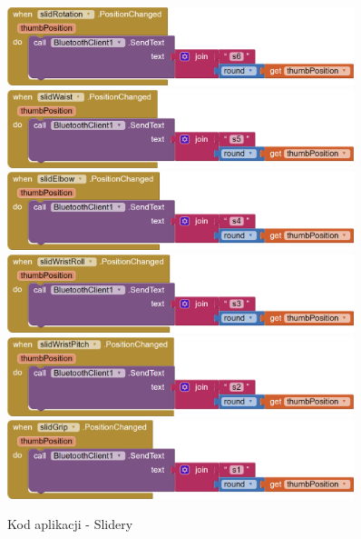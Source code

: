 \documentclass[11pt,titlepage,a4paper]{article}
\begin{document}
\begin{figure}
    \begin{center}
        \includegraphics[width=0.9\textwidth]{img/app_src/sliders/slidRotation.png}
        \includegraphics[width=0.9\textwidth]{img/app_src/sliders/slidWaist.png}
        \includegraphics[width=0.9\textwidth]{img/app_src/sliders/slidElbow.png}
        \includegraphics[width=0.9\textwidth]{img/app_src/sliders/slidWristRoll.png}
        \includegraphics[width=0.9\textwidth]{img/app_src/sliders/slidWristPitch.png}
        \includegraphics[width=0.9\textwidth]{img/app_src/sliders/slidGrip.png}
    \end{center}
    \caption{Kod aplikacji - Slidery}
    \label{AppSlidery}
\end{figure}
\end{document}
